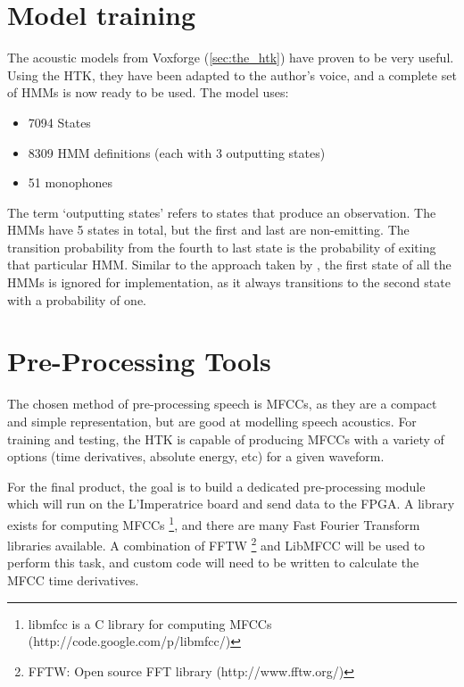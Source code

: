 \section{Model training} %
\label{sec:model_training}
The acoustic models from Voxforge (\ref{sec:the_htk}) have proven to be very useful.  Using the HTK, they have been adapted to the author's voice, and a complete set of HMMs is now ready to be used.  The model uses:
\begin{itemize}
	\item 7094 States
	\item 8309 HMM definitions (each with 3 outputting states)
	\item 51 monophones
\end{itemize}
The term `outputting states' refers to states that produce an observation.  The HMMs have 5 states in total, but the first and last are non-emitting.  The transition probability from the fourth to last state is the probability of exiting that particular HMM.  Similar to the approach taken by \cite{melnikoff2003speech}, the first state of all the HMMs is ignored for implementation, as it always transitions to the second state with a probability of one.

\section{Pre-Processing Tools} %
\label{sec:pre_processing_tools}
The chosen method of pre-processing speech is MFCCs, as they are a compact and simple representation, but are good at modelling speech acoustics.  For training and testing, the HTK is capable of producing MFCCs with a variety of options (time derivatives, absolute energy, etc) for a given waveform.

For the final product, the goal is to build a dedicated pre-processing module which will run on the L'Imperatrice board and send data to the FPGA.  A library exists for computing MFCCs \footnote{libmfcc is a C library for computing MFCCs (http://code.google.com/p/libmfcc/)}, and there are many Fast Fourier Transform libraries available.  A combination of FFTW \footnote{FFTW: Open source FFT library (http://www.fftw.org/)} and LibMFCC will be used to perform this task, and custom code will need to be written to calculate the MFCC time derivatives.  

